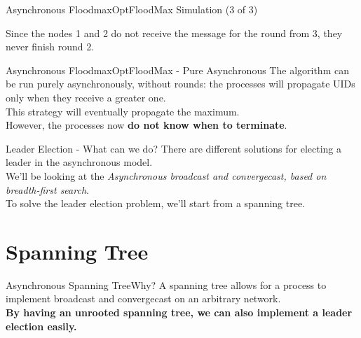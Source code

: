 \documentclass[pdf]{beamer}
\begin{document}
\begin{frame}{Asynchronous Floodmax}{OptFloodMax Simulation (3 of 3)}
\begin{center}
\end{center}
Since the nodes 1 and 2 do not receive the message for the round from 3, they never finish round 2. \\
\vspace{12pt}
\end{frame}

\begin{frame}{Asynchronous Floodmax}{OptFloodMax - Pure Asynchronous}
    The algorithm can be run purely asynchronously, without rounds: the processes will propagate UIDs only when they receive a greater one.\\
    \vspace{12pt}
    This strategy will eventually propagate the maximum.\\
    \vspace{12pt}
    However, the processes now \textbf{do not know when to terminate}.
\end{frame}

\begin{frame}{Leader Election - What can we do?}
    There are different solutions for electing a leader in the asynchronous model.\\
    \vspace{12pt}
    We'll be looking at the \emph{Asynchronous broadcast and convergecast, based on breadth-first search}.\\
    \vspace{12pt}
    To solve the leader election problem, we'll start from a spanning tree.
\end{frame}

\section{Spanning Tree}
\begin{frame}{Asynchronous Spanning Tree}{Why?}
    A spanning tree allows for a process to implement broadcast and convergecast on
    an arbitrary network.\\
    \vspace{12pt}
    \textbf{By having an unrooted spanning tree, we can also implement a leader election 
    easily.}
\end{frame}
\end{document}
